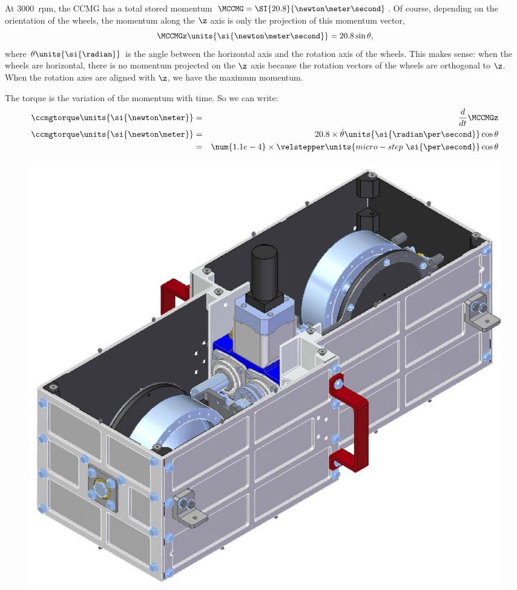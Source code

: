 At \num{3000}~rpm, the CCMG has a total stored momentum $\MCCMG= \SI{20.8}{\newton\meter\second}$. Of course, depending on the orientation of the wheels, the momentum along the $\z$ axis is only the projection of this momentum vector,
\begin{equation}
\MCCMGz\units{\si{\newton\meter\second}} = 20.8\sin\theta,
\end{equation}
where $\theta\units{\si{\radian}}$ is the angle between the horizontal axis and the rotation axis of the wheels. This makes sense: when the wheels are horizontal, there is no momentum projected on the $\z$ axis because the rotation vectors of the wheels are orthogonal to $\z$. When the rotation axes are aligned with $\z$, we have the maximum momentum. 

The torque is the variation of the momentum with time. So we can write:
\begin{eqnarray}
\ccmgtorque\units{\si{\newton\meter}} &= &\frac{d}{dt}\MCCMGz\\
\ccmgtorque\units{\si{\newton\meter}} &= & 20.8\times \dot{\theta}\units{\si{\radian\per\second}} \cos\theta\\
 &= & \num{1.1e-4}\times \velstepper\units{micro-step~\si{\per\second}}\cos\theta
 \label{eq:CCMGTorque}
\end{eqnarray}

\begin{figure}[!ht]
	\centering
	
	\caption{}
	\label{fig:CCMGnocase}
    \end{figure}

\begin{figure}[!ht]
	\centering
	\includegraphics[width=\textwidth]{Figures/CCMG-case.png}
	\caption{}
	\label{fig:CCMGcase}
    \end{figure}


